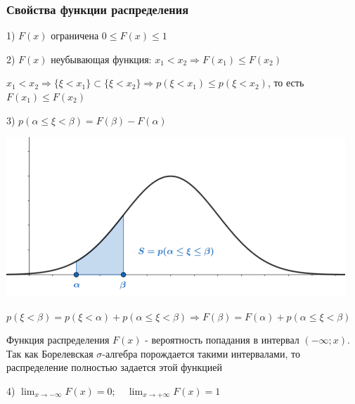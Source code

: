\documentclass[12pt]{article}
\begin{document}
    \subsubsection{Свойства функции распределения}

    1) $F(x)$ ограничена $0 \leq F(x) \leq 1$

    2) $F(x)$ неубывающая функция: $x_1 < x_2 \Longrightarrow F(x_1) \leq F(x_2)$ 

    \begin{MyProof}
        $x_1 < x_2 \Longrightarrow \{\xi < x_1\} \subset \{\xi < x_2\} \Longrightarrow p(\xi < x_1) \leq p(\xi < x_2)$, то есть $F(x_1) \leq F(x_2)$
    \end{MyProof}

    3) $p(\alpha \leq \xi < \beta) = F(\beta) - F(\alpha)$

    \includegraphics[height=6cm]{probtheory/images/probtheory_2024_10_22_4}

    \begin{MyProof}
        $p(\xi < \beta) = p(\xi < \alpha) + p(\alpha \leq \xi < \beta) \Longrightarrow F(\beta) = F(\alpha) + p(\alpha \leq \xi < \beta)$
    \end{MyProof}
    
    \Notas Функция распределения $F(x)$ - вероятность попадания в интервал $(-\infty; x)$. Так как Борелевская $\sigma$-алгебра порождается такими интервалами,
    то распределение полностью задается этой функцией

    4) $\lim_{x \to -\infty} F(x) = 0; \quad \lim_{x \to +\infty} F(x) = 1$
\end{document}
